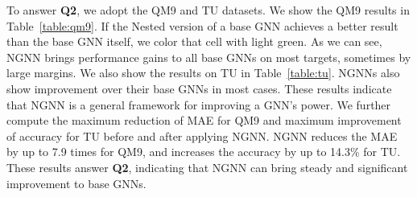 \documentclass{article}
\begin{document}
To answer \textbf{Q2}, we adopt the QM9 and TU datasets. We show the QM9 results in Table~\ref{table:qm9}. If the Nested version of a base GNN achieves a better result than the base GNN itself, we color that cell with light green. As we can see, NGNN brings performance gains to all base GNNs on most targets, sometimes by large margins. We also show the results on TU in Table~\ref{table:tu}. NGNNs also show improvement over their base GNNs in most cases. These results indicate that NGNN is a general framework for improving a GNN's power. We further compute the maximum reduction of MAE for QM9 and maximum improvement of accuracy for TU before and after applying NGNN. NGNN reduces the MAE by up to 7.9 times for QM9, and increases the accuracy by up to 14.3\% for TU. These results answer \textbf{Q2}, indicating that NGNN can bring steady and significant improvement to base GNNs.   
\end{document}
